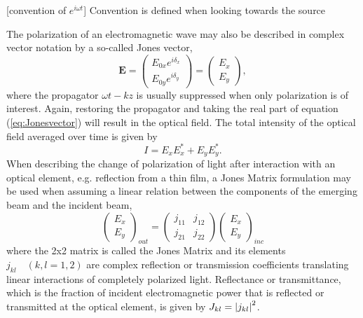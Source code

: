 [convention of $e^{i\omega t}$] Convention is defined when looking towards the source

The polarization of an electromagnetic wave may also be described in complex vector notation by a so-called Jones vector, 
\begin{equation}
    \mathbf{E} = 
    \begin{pmatrix}
        E_{0x}e^{i\delta_x} \\
        E_{0y}e^{i\delta_y} 
    \end{pmatrix}
    =
    \begin{pmatrix}
        E_{x} \\
        E_{y} 
    \end{pmatrix},
    \label{eq:Jonesvector}
\end{equation}
where the propagator $\omega t - kz$ is usually suppressed when only polarization is of interest\cite{collett}. Again, restoring the propagator and taking the real part of equation (\ref{eq:Jonesvector}) will result in the optical field. The total intensity of the optical field averaged over time is given by
\begin{equation}
    I = E_xE_x^* + E_yE_y^*.
\end{equation}
When describing the change of polarization of light after interaction with an optical element, e.g. reflection from a thin film, a Jones Matrix formulation may be used when assuming a linear relation between the components of the emerging beam and the incident beam,
\begin{equation}
    \begin{pmatrix}
        E_{x} \\
        E_{y} 
    \end{pmatrix}_{out}
    =
    \begin{pmatrix}
        j_{11} & j_{12} \\
        j_{21} & j_{22} 
    \end{pmatrix}
    \begin{pmatrix}
        E_{x} \\
        E_{y} 
    \end{pmatrix}_{inc}
\end{equation}
where the 2x2 matrix is called the Jones Matrix and its elements $j_{kl}\quad(k,l = 1,2)$ are complex reflection or transmission coefficients translating linear interactions of completely polarized light. Reflectance or transmittance, which is the fraction of incident electromagnetic power that is reflected or transmitted at the optical element, is given by $J_{kl} = \left| j_{kl} \right|^2$.

